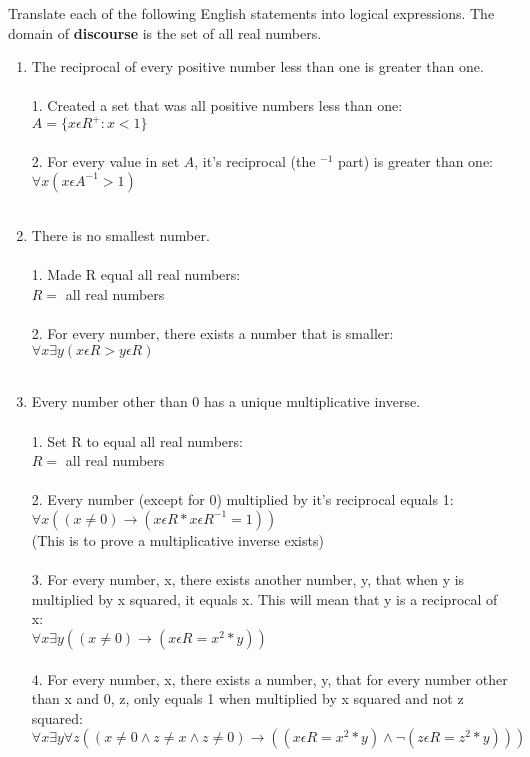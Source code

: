 \documentclass{amsart}
\theoremstyle{definition}
\theoremstyle{Exercise}
\theoremstyle{remark}
\theoremstyle{rule}
\numberwithin{equation}{section}
\begin{document}
Translate each of the following English statements into logical expressions. The domain of {\bf discourse} is the set of all real numbers.\\
\begin{enumerate}[label=(\alph*)]

\item The reciprocal of every positive number less than one is greater than one.\\\\
1. Created a set that was all positive numbers less than one:\\
$A = \{x\epsilon R^+ : x < 1\}$\\\\
2. For every value in set $A$, it's reciprocal (the $^{-1}$ part) is greater than one:\\
$\forall x (x\epsilon A^{-1} > 1)$
\\\\
\item There is no smallest number.\\\\
1. Made R equal all real numbers:\\
$R = $ all real numbers\\\\
2. For every  number, there exists a number that is smaller:\\
$\forall x \exists y (x\epsilon R > y\epsilon R)$
\\\\

\item Every number other than 0 has a unique multiplicative inverse.\\\\
1. Set R to equal all real numbers:\\
$R = $ all real numbers\\\\
2. Every  number (except for 0) multiplied by it's reciprocal equals 1:\\
$\forall x ((x \not= 0) \to (x\epsilon R * x\epsilon R^{-1} = 1 ))$\\
(This is to prove a multiplicative inverse exists)\\\\
3. For every number, x, there exists another number, y, that when y is multiplied by x squared, it equals x. This will mean that y is a reciprocal of x:\\
$\forall x \exists y ((x \not= 0) \to (x\epsilon R = x^2 * y))$\\\\
4. For every number, x, there exists a number, y, that for every number other than x and 0, z, only equals 1 when multiplied by x squared and not z squared:\\
$\forall x \exists y \forall z((x \not= 0 \land z \not= x \land z \not = 0) \to ((x\epsilon R = x^2 * y) \land \neg (z\epsilon R = z^2 * y)))$

\\\\
\end{enumerate}
\end{document}
